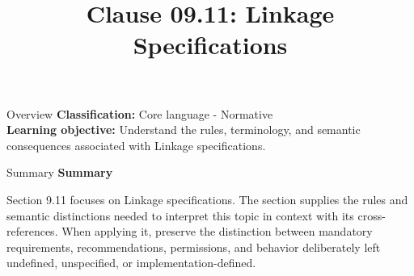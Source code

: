\documentclass[10pt,letterpaper]{article}
\title{Clause 09.11: Linkage Specifications}
\author{}
\date{}
\begin{document}
\maketitle
\begin{CornellOverviewBox}{Overview}
\textbf{Classification:} Core language - Normative\\[2pt]
\textbf{Learning objective:} Understand the rules, terminology, and semantic consequences associated with Linkage specifications.
\end{CornellOverviewBox}\begin{CornellSummaryBox}{Summary}
{\sffamily\bfseries\color{Accent} Summary}\par\vspace{3pt}Section 9.11 focuses on Linkage specifications. The section supplies the rules and semantic distinctions needed to interpret this topic in context with its cross-references. When applying it, preserve the distinction between mandatory requirements, recommendations, permissions, and behavior deliberately left undefined, unspecified, or implementation-defined.
\end{CornellSummaryBox}
\end{document}
